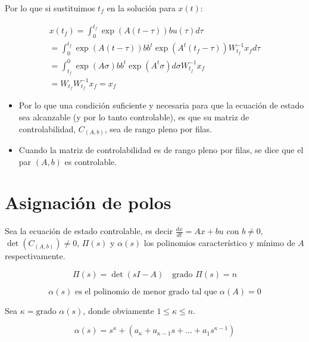         Por lo que si sustituimos $t_f$ en la solución para $x(t)$:

        \begin{multline}
            x(t_f) = \int_0^{t_f} \exp{(A(t - \tau))} b u(\tau) d\tau \\
                   = \int_0^{t_f} \exp{(A(t - \tau))} b b^t \exp{(A^t(t_f - \tau))} W_{t_f}^{-1} x_f d\tau \\
                   = \int_{t_f}^0 \exp{(A \sigma)} b b^t \exp{(A^t \sigma)} d\sigma W_{t_f}^{-1} x_f \\
                   = W_{t_f} W_{t_f}^{-1} x_f = x_f
        \end{multline}

        \begin{itemize}
            \item Por lo que una condición suficiente y necesaria para que la ecuación de estado sea alcanzable (y por lo tanto controlable), es que su matriz de controlabilidad, $C_{(A,b)}$, sea de rango pleno por filas.
            \item Cuando la matriz de controlabilidad es de rango pleno por filas, se dice que el par $(A, b)$ es controlable.
        \end{itemize}

    \newpage
    \section{Asignación de polos}

        Sea la ecuación de estado controlable, es decir $\frac{dx}{dt} = Ax + bu$ con $b \ne 0$, $\det{(C_{(A,b)})} \ne 0$, $\Pi(s)$ y $\alpha(s)$ los polinomios característico y mínimo de $A$ respectivamente.

        \begin{equation}
            \Pi(s) = \det{(sI - A)} \quad \text{grado } \Pi(s) = n \nonumber
        \end{equation}

        \begin{equation}
            \alpha(s) \text{ es el polinomio de menor grado tal que } \alpha(A) = 0 \nonumber
        \end{equation}

        Sea $\kappa = \text{grado } \alpha(s)$, donde obviamente $1 \le \kappa \le n$.

        \begin{equation}
            \alpha(s) = s^{\kappa} + (a_{\kappa} + a_{\kappa - 1} s + \dots + a_1 s^{\kappa - 1}) \nonumber
        \end{equation}

